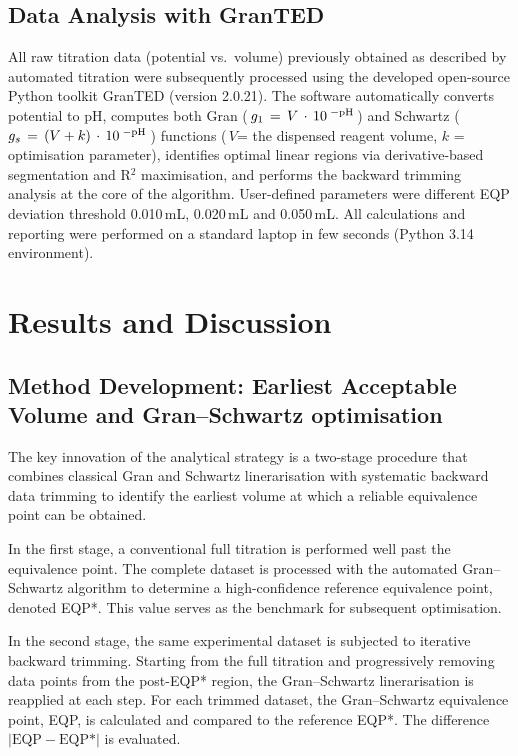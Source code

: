 \documentclass[twoside,twocolumn,9pt]{article}
\begin{document}
\subsection*{Data Analysis with GranTED}

All raw titration data (potential vs.\, volume) previously obtained as described by automated titration were subsequently processed using the developed open-source Python toolkit \textsf{GranTED} (version 2.0.21). The software automatically converts potential to pH, computes both Gran (\,\(g_1\, =\, V\,\cdot\,10^{\;{\rm -pH}}\)\,) and Schwartz (\mbox{\,\(g_s\, =\, (V+k)\,\cdot\,10^{\;{\rm -pH}}\)}\,) functions (\,\(V\)= the dispensed reagent volume, \(k\) = optimisation parameter), identifies optimal linear regions via derivative-based segmentation and R$^2$ maximisation, and performs the backward trimming analysis at the core of the algorithm. User-defined parameters were different EQP deviation threshold 0.010\,mL, 0.020\,mL and 0.050\,mL. All calculations and reporting were performed on a standard laptop in few seconds (Python 3.14 environment).

\section*{Results and Discussion}

\subsection*{Method Development: Earliest Acceptable Volume and Gran--Schwartz optimisation}

The key innovation of the analytical strategy is a two-stage procedure that combines classical Gran and Schwartz linerarisation with systematic backward data trimming to identify the earliest volume at which a reliable equivalence point can be obtained. 

In the first stage, a conventional full titration is performed well past the equivalence point.
The complete dataset is processed with the automated Gran--Schwartz algorithm to determine a high-confidence reference equivalence point, denoted EQP*.
This value serves as the benchmark for subsequent optimisation.

In the second stage, the same experimental dataset is subjected to iterative backward trimming.
Starting from the full titration and progressively removing data points from the post-EQP* region, the Gran--Schwartz linerarisation is reapplied at each step.
For each trimmed dataset, the Gran--Schwartz equivalence point, EQP, is calculated and compared to the reference EQP*.
The difference $|\text{EQP} - \text{EQP*}|$ is evaluated.
\end{document}
